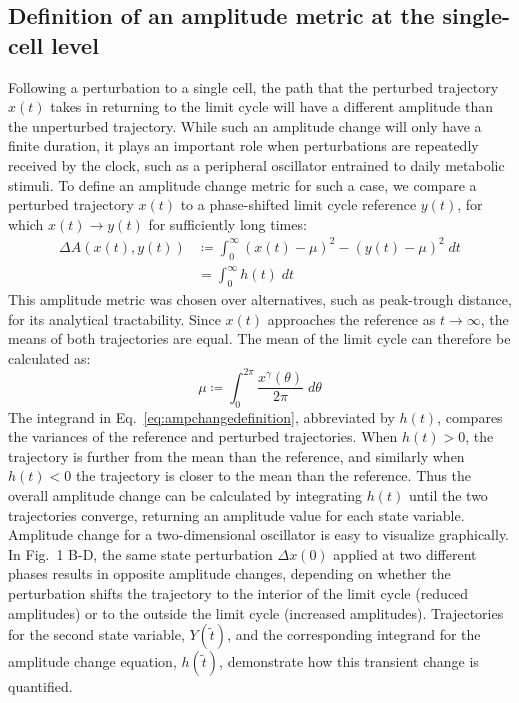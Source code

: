 \documentclass[11pt, letterpaper]{article}
\begin{document}
\subsection*{Definition of an amplitude metric at the single-cell level}

Following a perturbation to a single cell, the path that the perturbed trajectory $x(t)$ takes in returning to the limit cycle will have a different amplitude than the unperturbed trajectory.
While such an amplitude change will only have a finite duration, it plays an important role when perturbations are repeatedly received by the clock, such as a peripheral oscillator entrained to daily metabolic stimuli.
To define an amplitude change metric for such a case, we compare a perturbed trajectory $x(t)$ to a phase-shifted limit cycle reference $y(t)$, for which $x(t) \to y(t)$ for sufficiently long times:
\begin{equation}
  \begin{aligned}
    \Delta A (x(t), y(t)) &\coloneqq \int_0^\infty (x(t) - \mu)^2 - (y(t) - \mu)^2 \; dt\\
    &= \int_0^\infty h(t) \; dt
  \end{aligned}
  \label{eq:ampchangedefinition}
\end{equation}
This amplitude metric was chosen over alternatives, such as peak-trough distance, for its analytical tractability.
Since $x(t)$ approaches the reference as $t \to \infty$, the means of both trajectories are equal.
The mean of the limit cycle can therefore be calculated as:
\begin{equation}
  \mu \coloneqq \int_0^{2\pi} \frac{x^\gamma(\theta)}{2\pi} \; d\theta
  \label{eq:mu}
\end{equation}
The integrand in Eq.~\ref{eq:ampchangedefinition}, abbreviated by $h(t)$, compares the variances of the reference and perturbed trajectories.
When $h(t) > 0$, the trajectory is further from the mean than the reference, and similarly when $h(t) < 0$ the trajectory is closer to the mean than the reference.
Thus the overall amplitude change can be calculated by integrating $h(t)$ until the two trajectories converge, returning an amplitude value for each state variable.
Amplitude change for a two-dimensional oscillator is easy to visualize graphically.
In Fig.~1 B-D, the same state perturbation $\Delta x(0)$ applied at two different phases results in opposite amplitude changes, depending on whether the perturbation shifts the trajectory to the interior of the limit cycle (reduced amplitudes) or to the outside the limit cycle (increased amplitudes).
Trajectories for the second state variable, $Y(\tilde{t})$, and the corresponding integrand for the amplitude change equation, $h(\tilde{t})$, demonstrate how this transient change is quantified.
\end{document}
